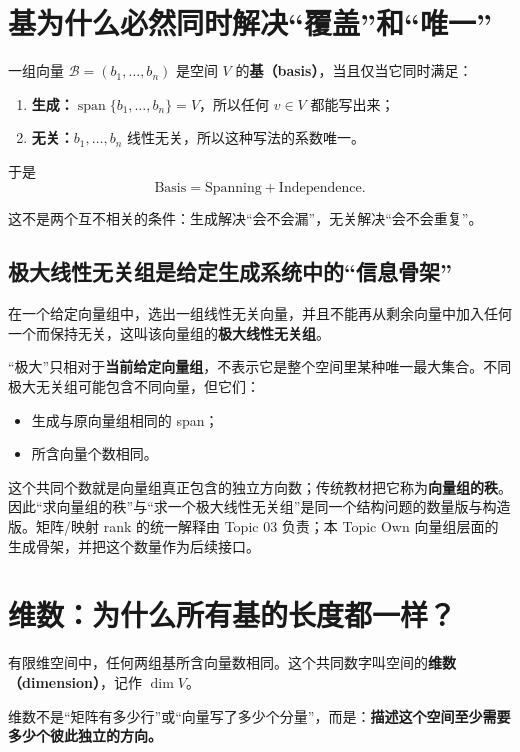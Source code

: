 \documentclass[11pt,a4paper]{ctexart}
\newcommand{\kw}[1]{\textbf{\color{deep}#1}}
\begin{document}
\section{基为什么必然同时解决“覆盖”和“唯一”}

一组向量 $\mathcal B=(b_1,\dots,b_n)$ 是空间 $V$ 的\kw{基（basis）}，当且仅当它同时满足：

\begin{enumerate}
  \item \kw{生成：}$\operatorname{span}\{b_1,\dots,b_n\}=V$，所以任何 $v\in V$ 都能写出来；
  \item \kw{无关：}$b_1,\dots,b_n$ 线性无关，所以这种写法的系数唯一。
\end{enumerate}

于是
\[
\boxed{\text{Basis}=\text{Spanning}+\text{Independence}.}
\]

这不是两个互不相关的条件：生成解决“会不会漏”，无关解决“会不会重复”。

\subsection{极大线性无关组是给定生成系统中的“信息骨架”}

在一个给定向量组中，选出一组线性无关向量，并且不能再从剩余向量中加入任何一个而保持无关，这叫该向量组的\kw{极大线性无关组}。

“极大”只相对于\kw{当前给定向量组}，不表示它是整个空间里某种唯一最大集合。不同极大无关组可能包含不同向量，但它们：

\begin{itemize}
  \item 生成与原向量组相同的 span；
  \item 所含向量个数相同。
\end{itemize}

这个共同个数就是向量组真正包含的独立方向数；传统教材把它称为\kw{向量组的秩}。因此“求向量组的秩”与“求一个极大线性无关组”是同一个结构问题的数量版与构造版。矩阵/映射 rank 的统一解释由 Topic 03 负责；本 Topic Own 向量组层面的生成骨架，并把这个数量作为后续接口。

\section{维数：为什么所有基的长度都一样？}

有限维空间中，任何两组基所含向量数相同。这个共同数字叫空间的\kw{维数（dimension）}，记作 $\dim V$。

维数不是“矩阵有多少行”或“向量写了多少个分量”，而是：\kw{描述这个空间至少需要多少个彼此独立的方向。}
\end{document}
